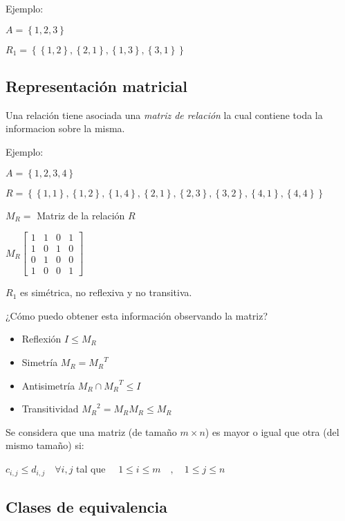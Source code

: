 \documentclass[a4paper, twoside]{article}
\begin{document}
	Ejemplo:
	
	$A = \left\{1,2,3\right\}$
	
	$R_1 = \left\{ \left\{ 1,2\right\} , \left\{ 2,1\right\}  , \left\{ 1,3\right\}  , \left\{ 3,1\right\}  \right\}$

	\subsection{Representación matricial}
	Una relación tiene asociada una \emph{matriz de relación} la cual 
	contiene toda la informacion sobre la misma.
	
	Ejemplo:
	
	$A = \left\{1,2,3,4\right\}$
	
	$R = \left\{ \left\{ 1,1\right\} , \left\{ 1,2\right\}  , \left\{ 1,4\right\}  , \left\{ 2,1\right\} , \left\{ 2,3\right\} , \left\{ 3,2\right\} , \left\{ 4,1\right\} , \left\{ 4,4\right\} \right\}$

	$M_R =$ Matriz de la relación $R$ 
	
	$ M_R \left[\begin{array}{cccc}
	1 & 1 & 0 & 1\\
	1 & 0 & 1 & 0\\
	0 & 1 & 0 & 0\\
	1 & 0 & 0 & 1\end{array}\right]$
	
	$R_1$ es simétrica, no reflexiva y no transitiva.
	
	¿Cómo puedo obtener esta información observando la matriz?
	
	\begin{itemize}
		\item{Reflexión}  $I \leq M_R$
		\item{Simetría} $M_R = {M_R}^T$
		\item{Antisimetría} $M_R \cap {M_R}^T \leq I$
		\item{Transitividad} ${M_R}^2 = M_R M_R \leq M_R$
	\end{itemize}
	
	Se considera que una matriz (de tamaño $m \times n$) es mayor o igual que otra (del mismo tamaño) si:
	\begin{center}
	$c_{i,j} \leq d_{i,j} \quad \forall i,j$ tal que $\quad 1 \leq i \leq m \quad , \quad  1 \leq j \leq n $
	\end{center}	

	\subsection{Clases de equivalencia}
	
\end{document}
